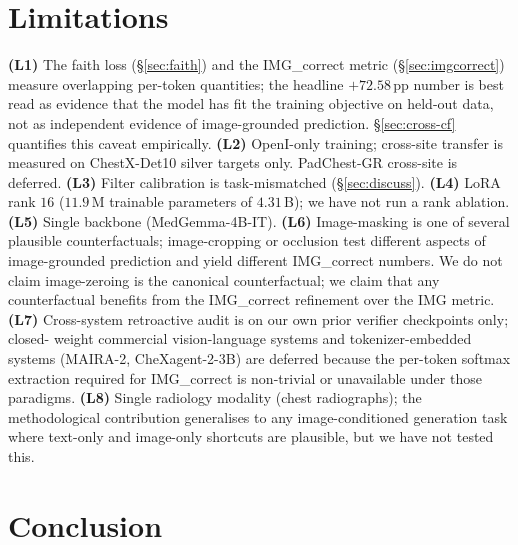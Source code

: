 \documentclass{article}
\begin{document}
\section{Limitations}
\label{sec:limits}

\textbf{(L1)} The faith loss (\S\ref{sec:faith}) and the IMG\_correct
metric (\S\ref{sec:imgcorrect}) measure overlapping per-token quantities;
the headline $+72.58$\,pp number is best read as evidence that the model
has fit the training objective on held-out data, not as independent
evidence of image-grounded prediction. \S\ref{sec:cross-cf}
quantifies this caveat empirically. \textbf{(L2)} OpenI-only training;
cross-site transfer is measured on ChestX-Det10 silver targets only.
PadChest-GR cross-site is deferred. \textbf{(L3)} Filter calibration is
task-mismatched (\S\ref{sec:discuss}). \textbf{(L4)} LoRA rank $16$ ($11.9$\,M
trainable parameters of $4.31$\,B); we have not run a rank ablation.
\textbf{(L5)} Single backbone (MedGemma-4B-IT). \textbf{(L6)} Image-masking
is one of several plausible counterfactuals; image-cropping or occlusion
test different aspects of image-grounded prediction and yield different
IMG\_correct numbers. We do not claim image-zeroing is the canonical
counterfactual; we claim that any counterfactual benefits from the
IMG\_correct refinement over the IMG metric. \textbf{(L7)} Cross-system
retroactive audit is on our own prior verifier checkpoints only; closed-
weight commercial vision-language systems and tokenizer-embedded systems
(MAIRA-2, CheXagent-2-3B) are deferred because the per-token softmax
extraction required for IMG\_correct is non-trivial or unavailable under
those paradigms. \textbf{(L8)} Single radiology
modality (chest radiographs); the methodological contribution generalises
to any image-conditioned generation task where text-only and image-only
shortcuts are plausible, but we have not tested this.

\section{Conclusion}
\label{sec:conclusion}
\end{document}
